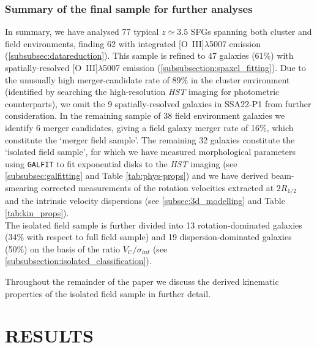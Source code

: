 \documentclass[fleqn,usenatbib]{mn2e}
\begin{document}
\subsubsection{Summary of the final sample for further analyses}\label{subsubsec:kin_sample_summary}
In summary, we have analysed 77 typical $z\simeq3.5$ SFGs spanning both cluster and field environments, finding 62 with integrated [O~{\sc III}]$\lambda$5007 emission (\cref{subsubsec:datareduction}).
This sample is refined to 47 galaxies (61\%) with spatially-resolved [O~{\sc III}]$\lambda$5007 emission (\cref{subsubsection:spaxel_fitting}).
Due to the unusually high merger-candidate rate of 89\% in the cluster environment (identified by searching the high-resolution {\em HST} imaging for photometric counterparts), we omit the 9 spatially-resolved galaxies in SSA22-P1 from further consideration.
In the remaining sample of 38 field environment galaxies we identify 6 merger candidates, giving a field galaxy merger rate of 16\%, which constitute the `merger field sample'.
The remaining 32 galaxies constitute the `isolated field sample', for which we have measured morphological parameters using {\tt GALFIT} to fit exponential disks to the {\em HST} imaging (see \cref{subsubsec:galfitting} and Table \ref{tab:phys-props}) and we have derived beam-smearing corrected measurements of the rotation velocities extracted at $2R_{1/2}$ and the intrinsic velocity dispersions (see \cref{subsec:3d_modelling} and Table \ref{tab:kin_props}). \\

The isolated field sample is further divided into 13 rotation-dominated galaxies (34\% with respect to full field sample) and 19 dispersion-dominated galaxies (50\%) on the basis of the ratio $V_{C}/\sigma_{int}$ (see \cref{subsubsection:isolated_classification}).

Throughout the remainder of the paper we discuss the derived kinematic properties of the isolated field sample in further detail.

\section{RESULTS}\label{sec:results}
\end{document}
